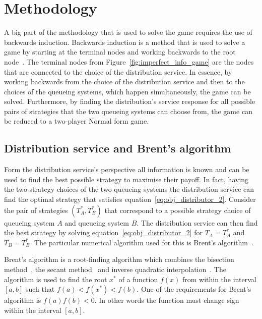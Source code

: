 \section{Methodology}\label{sec:game_methodology}

A big part of the methodology that is used to solve the game requires the use of
backwards induction.
Backwards induction is a method that is used to solve a game by starting at the
terminal nodes and working backwards to the root node~\cite{watson2002strategy}.
The terminal nodes from Figure~\ref{fig:imperfect_info_game} are the nodes that
are connected to the choice of the distribution service.
In essence, by working backwards from the choice of the distribution service
and then to the choices of the queueing systems, which happen simultaneously,
the game can be solved.
Furthermore, by finding the distribution's service response for all possible
pairs of strategies that the two queueing systems can choose from, the game can
be reduced to a two-player Normal form game.


\subsection{Distribution service and Brent's algorithm}
\label{sec:best_response_distribution_service}

Form the distribution service's perspective all information is known and can be
used to find the best possible strategy to maximise their payoff.
In fact, having the two strategy choices of the two queueing systems the
distribution service can find the optimal strategy that satisfies
equation~\eqref{eq:obj_distributor_2}.
Consider the pair of strategies \((T_A^*, T_B^*)\) that correspond to a possible
strategy choice of queueing system \(A\) and queueing system \(B\).
The distribution service can then find the best strategy by solving
equation~\eqref{eq:obj_distributor_2} for \(T_A = T_A^*\) and \(T_B = T_B^*\).
The particular numerical algorithm used for this is Brent's
algorithm~\cite{brent_method}.

Brent's algorithm is a root-finding algorithm which combines the bisection
method~\cite{corliss1977root}, the secant method~\cite{secantmethod} and
inverse quadratic interpolation~\cite{epperson2021introduction}.
The algorithm is used to find the root \(x^*\) of a function \(f(x)\) from
within the interval \([a, b]\) such that \(f(a) < f(x^*) < f(b)\).
One of the requirements for Brent's algorithm is \(f(a)f(b) < 0\).
In other words the function must change sign within the interval \([a, b]\).

